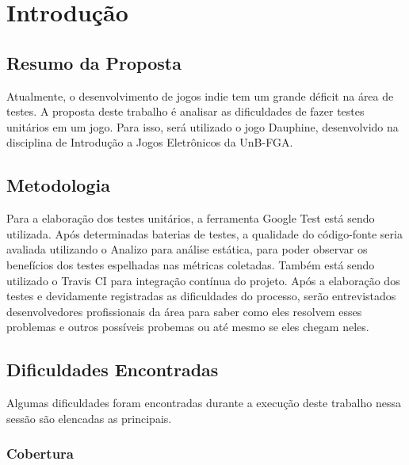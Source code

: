 \chapter[Introdução]{Introdução}

\section{Resumo da Proposta}
Atualmente, o desenvolvimento de jogos indie tem um grande déficit na área de testes. A proposta deste trabalho é analisar as dificuldades de fazer testes unitários em um jogo. Para isso, será utilizado o jogo Dauphine, desenvolvido na disciplina de Introdução a Jogos Eletrônicos da UnB-FGA.

\section{Metodologia}

Para a elaboração dos testes unitários, a ferramenta Google Test está sendo utilizada. Após determinadas baterias de testes, a qualidade do código-fonte seria avaliada utilizando o Analizo para análise estática, para poder observar os benefícios dos testes espelhadas nas métricas coletadas. Também está sendo utilizado o Travis CI para integração contínua do projeto. Após a elaboração dos testes e devidamente registradas as dificuldades do processo, serão entrevistados desenvolvedores profissionais da área para saber como eles resolvem esses problemas e outros possíveis probemas ou até mesmo se eles chegam neles.

\section{Dificuldades Encontradas}
Algumas dificuldades foram encontradas durante a execução deste trabalho nessa sessão são elencadas as principais.

\subsection{Cobertura}

